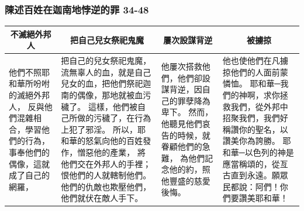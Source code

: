 \subsubsection{陳述百姓在迦南地悖逆的罪 34-48}
\begin{table}[H]
\centering
\begin{tabular}{p{2.25cm}|p{6.2cm}|p{3.00cm}|p{5.00cm}}\hline\hline
\multicolumn{1}{c|}{不滅絕外邦人}&\multicolumn{1}{c|}{把自己兒女祭祀鬼魔}&\multicolumn{1}{c|}{屢次設謀背逆}&\multicolumn{1}{c}{被擄掠}\\\hline
他們不照耶和華所吩咐的滅絕外邦人，
反與他們混雜相合，學習他們的行為，
事奉他們的偶像，這就成了自己的網羅，
&把自己的兒女祭祀鬼魔，
流無辜人的血，就是自己兒女的血，把他們祭祀迦南的偶像，那地就被血污穢了。
這樣，他們被自己所做的污穢了，在行為上犯了邪淫。
所以，耶和華的怒氣向他的百姓發作，憎惡他的產業，
將他們交在外邦人的手裡；恨他們的人就轄制他們。
他們的仇敵也欺壓他們，他們就伏在敵人手下。
&他屢次搭救他們，他們卻設謀背逆，因自己的罪孽降為卑下。
然而，他聽見他們哀告的時候，就眷顧他們的急難，
為他們記念他的約，照他豐盛的慈愛後悔。
&他也使他們在凡擄掠他們的人面前蒙憐恤。
耶和華─我們的神啊，求你拯救我們，從外邦中招聚我們，我們好稱讚你的聖名，以讚美你為誇勝。
耶和華─以色列的神是應當稱頌的，從亙古直到永遠。願眾民都說：阿們！你們要讚美耶和華！
\\\hline
\end{tabular}
\end{table} 












